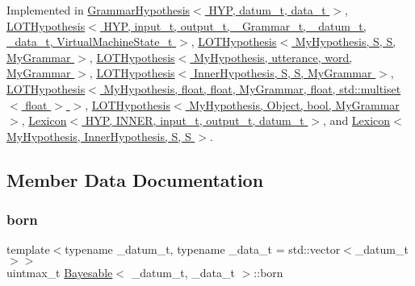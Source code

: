 Implemented in \hyperlink{class_grammar_hypothesis_a55ee98de75a30cea35fdaf62ccf14a90}{Grammar\+Hypothesis$<$ H\+Y\+P, datum\+\_\+t, data\+\_\+t $>$}, \hyperlink{class_l_o_t_hypothesis_acda322aef217a0d358ae6cea19969904}{L\+O\+T\+Hypothesis$<$ H\+Y\+P, input\+\_\+t, output\+\_\+t, \+\_\+\+Grammar\+\_\+t, \+\_\+datum\+\_\+t, \+\_\+data\+\_\+t, Virtual\+Machine\+State\+\_\+t $>$}, \hyperlink{class_l_o_t_hypothesis_acda322aef217a0d358ae6cea19969904}{L\+O\+T\+Hypothesis$<$ My\+Hypothesis, S, S, My\+Grammar $>$}, \hyperlink{class_l_o_t_hypothesis_acda322aef217a0d358ae6cea19969904}{L\+O\+T\+Hypothesis$<$ My\+Hypothesis, utterance, word, My\+Grammar $>$}, \hyperlink{class_l_o_t_hypothesis_acda322aef217a0d358ae6cea19969904}{L\+O\+T\+Hypothesis$<$ Inner\+Hypothesis, S, S, My\+Grammar $>$}, \hyperlink{class_l_o_t_hypothesis_acda322aef217a0d358ae6cea19969904}{L\+O\+T\+Hypothesis$<$ My\+Hypothesis, float, float, My\+Grammar, float, std\+::multiset$<$ float $>$ $>$}, \hyperlink{class_l_o_t_hypothesis_acda322aef217a0d358ae6cea19969904}{L\+O\+T\+Hypothesis$<$ My\+Hypothesis, Object, bool, My\+Grammar $>$}, \hyperlink{class_lexicon_a5c584d2885a21542082332a26eb0961b}{Lexicon$<$ H\+Y\+P, I\+N\+N\+E\+R, input\+\_\+t, output\+\_\+t, datum\+\_\+t $>$}, and \hyperlink{class_lexicon_a5c584d2885a21542082332a26eb0961b}{Lexicon$<$ My\+Hypothesis, Inner\+Hypothesis, S, S $>$}.



\subsection{Member Data Documentation}
\mbox{\label{class_bayesable_a898e03a20e1851c868b77ef4e844f0bf}} 
\subsubsection{\texorpdfstring{born}{born}}
{\footnotesize\ttfamily template$<$typename \+\_\+datum\+\_\+t, typename \+\_\+data\+\_\+t = std\+::vector$<$\+\_\+datum\+\_\+t$>$$>$ \\
uintmax\+\_\+t \hyperlink{class_bayesable}{Bayesable}$<$ \+\_\+datum\+\_\+t, \+\_\+data\+\_\+t $>$\+::born}

\mbox{\label{class_bayesable_a4d1a9ed826013bf079cea1867b6d4183}} 
